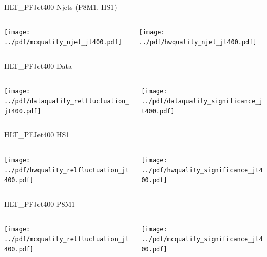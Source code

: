 \documentclass[9pt]{beamer}
\begin{document}
\begin{frame}[t]{HLT\_PFJet400 Njets (P8M1, HS1)}
\begin{columns}[T]
  \begin{column}{.5\textwidth}
  \texttt{[image: ../pdf/mcquality\_njet\_jt400.pdf]}
  \end{column}
  \begin{column}{.5\textwidth}
  \texttt{[image: ../pdf/hwquality\_njet\_jt400.pdf]}
  \end{column}
\end{columns}
\end{frame}

\begin{frame}[t]{HLT\_PFJet400 Data}
\begin{columns}[T]
  \begin{column}{.5\textwidth}
  \texttt{[image: ../pdf/dataquality\_relfluctuation\_jt400.pdf]}
  \end{column}
  \begin{column}{.5\textwidth}
  \texttt{[image: ../pdf/dataquality\_significance\_jt400.pdf]}
  \end{column}
\end{columns}
\end{frame}

\begin{frame}[t]{HLT\_PFJet400 HS1}
\begin{columns}[T]
  \begin{column}{.5\textwidth}
  \texttt{[image: ../pdf/hwquality\_relfluctuation\_jt400.pdf]}
  \end{column}
  \begin{column}{.5\textwidth}
  \texttt{[image: ../pdf/hwquality\_significance\_jt400.pdf]}
  \end{column}
\end{columns}
\end{frame}

\begin{frame}[t]{HLT\_PFJet400 P8M1}
\begin{columns}[T]
  \begin{column}{.5\textwidth}
  \texttt{[image: ../pdf/mcquality\_relfluctuation\_jt400.pdf]}
  \end{column}
  \begin{column}{.5\textwidth}
  \texttt{[image: ../pdf/mcquality\_significance\_jt400.pdf]}
  \end{column}
\end{columns}
\end{frame}
\end{document}
